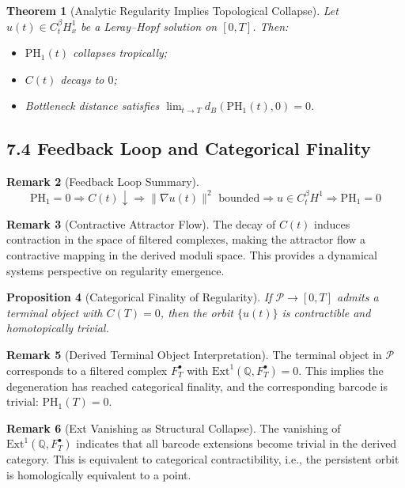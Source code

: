 \documentclass[11pt]{article}
\newtheorem{theorem}{Theorem}[section]
\newtheorem{proposition}[theorem]{Proposition}
\theoremstyle{definition}
\newtheorem{remark}[theorem]{Remark}
\begin{document}
\begin{theorem}[Analytic Regularity Implies Topological Collapse]
Let $u(t) \in C^\beta_t H^1_x$ be a Leray--Hopf solution on $[0, T]$. Then:
\begin{itemize}
  \item $\mathrm{PH}_1(t)$ collapses tropically;
  \item $C(t)$ decays to $0$;
  \item Bottleneck distance satisfies $\lim_{t \to T} d_B(\mathrm{PH}_1(t), 0) = 0$.
\end{itemize}
\end{theorem}

\subsection*{7.4 Feedback Loop and Categorical Finality}

\begin{remark}[Feedback Loop Summary]
\[
\text{PH}_1 = 0 \Longrightarrow C(t)\downarrow \Longrightarrow \|\nabla u(t)\|^2\text{ bounded} \Longrightarrow u \in C_t^\beta H^1 \Longrightarrow \text{PH}_1 = 0
\]
\end{remark}

\begin{remark}[Contractive Attractor Flow]
The decay of $C(t)$ induces contraction in the space of filtered complexes, making the attractor flow a contractive mapping in the derived moduli space. This provides a dynamical systems perspective on regularity emergence.
\end{remark}

\begin{proposition}[Categorical Finality of Regularity]
If $\mathcal{P} \to [0,T]$ admits a terminal object with $C(T) = 0$, then the orbit $\{ u(t) \}$ is contractible and homotopically trivial.
\end{proposition}

\begin{remark}[Derived Terminal Object Interpretation]
The terminal object in $\mathcal{P}$ corresponds to a filtered complex $F^\bullet_T$ with $\mathrm{Ext}^1(\mathbb{Q}, F^\bullet_T) = 0$. This implies the degeneration has reached categorical finality, and the corresponding barcode is trivial: $\mathrm{PH}_1(T) = 0$.
\end{remark}

\begin{remark}[Ext Vanishing as Structural Collapse]
The vanishing of $\mathrm{Ext}^1(\mathbb{Q}, F^\bullet_T)$ indicates that all barcode extensions become trivial in the derived category. This is equivalent to categorical contractibility, i.e., the persistent orbit is homologically equivalent to a point.
\end{remark}
\end{document}
